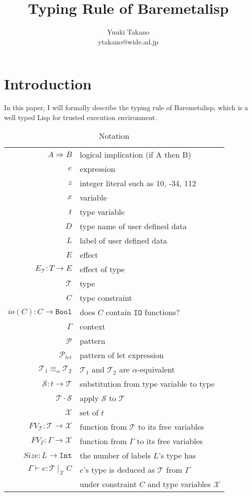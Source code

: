 \documentclass{article}
\title{Typing Rule of Baremetalisp}
\author{Yuuki Takano\\ ytakano@wide.ad.jp}
\begin{document}
\maketitle

\section{Introduction}

In this paper, I will formally describe the typing rule of Baremetalisp,
which is a well typed Lisp for trusted execution environment.

\begin{table}[tb]
    \centering
    \caption{Notation}
    \label{tab:notation}
    \begin{tabular}{rl}
        $A \Rightarrow B$ & logical implication (if A then B)\\
        $e$ & expression \\
        $z$ & integer literal such as 10, -34, 112 \\
        $x$ & variable \\
        $t$ & type variable \\
        $D$ & type name of user defined data \\
        $L$ & label of user defined data \\
        $E$ & effect \\
        $E_\mathcal{T}: T \rightarrow E$ & effect of type \\
        $\mathcal{T}$ & type \\
        $C$ & type constraint \\
        $io(C): C \rightarrow \mathtt{Bool}$ & does $C$ contain $\mathtt{IO}$ functions? \\
        $\Gamma$ & context \\
        $\mathcal{P}$ & pattern \\
        $\mathcal{P}_{let}$ & pattern of let expression \\
        $\mathcal{T}_1 \equiv_\alpha \mathcal{T}_2$ & $\mathcal{T}_1$ and $\mathcal{T}_2$ are $\alpha$-equivalent \\
        $\mathcal{S} : t \rightarrow \mathcal{T}$ & substitution from type variable to type\\
        $\mathcal{T} \cdot \mathcal{S}$ & apply $\mathcal{S}$ to $\mathcal{T}$ \\
        $\mathcal{X}$ & set of $t$ \\
        $FV_\mathcal{T} : \mathcal{T} \rightarrow \mathcal{X}$ & function from $\mathcal{T}$ to its free variables\\
        $FV_\Gamma : \Gamma \rightarrow \mathcal{X}$ & function from $\Gamma$ to its free variables\\
        $Size : L \rightarrow \mathtt{Int}$ & the number of labels $L$'s type has \\
        $\Gamma \vdash e : \mathcal{T}\ |_\mathcal{X}\ C$ & $e$'s type is deduced as $\mathcal{T}$ from $\Gamma$ \\
        & under constraint $C$ and type variables $\mathcal{X}$
    \end{tabular}
\end{table}
\end{document}
